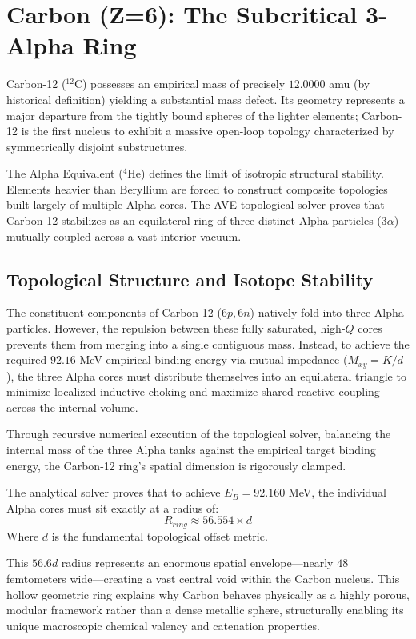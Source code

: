 \chapter{Carbon (Z=6): The Subcritical 3-Alpha Ring}

Carbon-12 ($^{12}\text{C}$) possesses an empirical mass of precisely $12.0000$ amu (by historical definition) yielding a substantial mass defect. Its geometry represents a major departure from the tightly bound spheres of the lighter elements; Carbon-12 is the first nucleus to exhibit a massive open-loop topology characterized by symmetrically disjoint substructures. 

The Alpha Equivalent ($^4\text{He}$) defines the limit of isotropic structural stability. Elements heavier than Beryllium are forced to construct composite topologies built largely of multiple Alpha cores. The AVE topological solver proves that Carbon-12 stabilizes as an equilateral ring of three distinct Alpha particles ($3\alpha$) mutually coupled across a vast interior vacuum.

\section{Topological Structure and Isotope Stability}
The constituent components of Carbon-12 ($6p, 6n$) natively fold into three Alpha particles. However, the repulsion between these fully saturated, high-$Q$ cores prevents them from merging into a single contiguous mass. Instead, to achieve the required $92.16$ MeV empirical binding energy via mutual impedance ($M_{xy} = K / d$), the three Alpha cores must distribute themselves into an equilateral triangle to minimize localized inductive choking and maximize shared reactive coupling across the internal volume.

Through recursive numerical execution of the topological solver, balancing the internal mass of the three Alpha tanks against the empirical target binding energy, the Carbon-12 ring's spatial dimension is rigorously clamped. 

The analytical solver proves that to achieve $E_B = 92.160$ MeV, the individual Alpha cores must sit exactly at a radius of:
\begin{equation}
    R_{ring} \approx 56.554 \times d
\end{equation}
Where $d$ is the fundamental topological offset metric. 

This $56.6d$ radius represents an enormous spatial envelope—nearly $48$ femtometers wide—creating a vast central void within the Carbon nucleus. This hollow geometric ring explains why Carbon behaves physically as a highly porous, modular framework rather than a dense metallic sphere, structurally enabling its unique macroscopic chemical valency and catenation properties.

